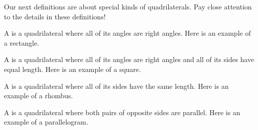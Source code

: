 \documentclass{ximera}
\begin{document}
Our next definitions are about special kinds of quadrilaterals. Pay close attention to the details in these definitions!

\begin{definition}
	A  is a quadrilateral where all of its angles are right angles. Here is an example of a rectangle.
	\begin{center}
	\end{center}
\end{definition}


\begin{definition}
	A  is a quadrilateral where all of its angles are right angles and all of its sides have equal length. Here is an example of a square.
	\begin{center}
	\end{center}
\end{definition}


\begin{definition}
	A  is a quadrilateral where all of its sides have the same length. Here is an example of a rhombus.
	\begin{center}
	\end{center}
\end{definition}


\begin{definition}
	A  is a quadrilateral where both pairs of opposite sides are parallel. Here is an example of a parallelogram.
	\begin{center}
	\end{center}
\end{definition}
\end{document}
